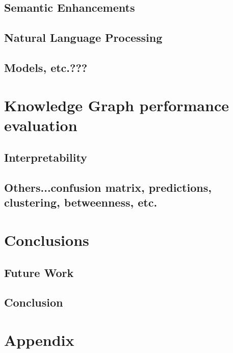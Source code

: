 \documentclass[11pt]{article}
\begin{document}
\subsection{Semantic Enhancements}
\subsection{Natural Language Processing}
\subsection{Models, etc.???}

\section{Knowledge Graph performance evaluation}
\subsection{Interpretability}
\subsection{Others...confusion matrix, predictions, clustering, betweenness, etc.}

\section{Conclusions}
\subsection{Future Work}
\subsection{Conclusion}

\section{Appendix}


\newpage


\end{document}
